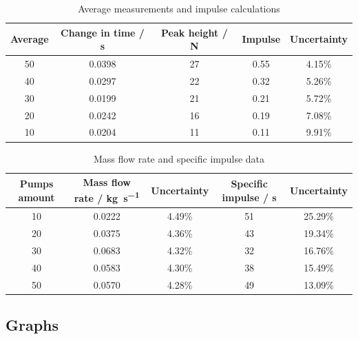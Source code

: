\documentclass[12pt,a4paper]{article}
\begin{document}
\begin{table}[H]
\centering
\caption{Average measurements and impulse calculations}
\begin{tabular}{@{}ccccc@{}}
\toprule
\textbf{Average} & \textbf{Change in time / \si{\second}} & \textbf{Peak height / \si{\newton}} & \textbf{Impulse} & \textbf{Uncertainty} \\
\midrule
50 & 0.0398 & 27 & 0.55 & 4.15\% \\
40 & 0.0297 & 22 & 0.32 & 5.26\% \\
30 & 0.0199 & 21 & 0.21 & 5.72\% \\
20 & 0.0242 & 16 & 0.19 & 7.08\% \\
10 & 0.0204 & 11 & 0.11 & 9.91\% \\
\bottomrule
\end{tabular}
\end{table}

\begin{table}[H]
\centering
\caption{Mass flow rate and specific impulse data}
\begin{tabular}{@{}ccccc@{}}
\toprule
\textbf{Pumps amount} & \textbf{Mass flow rate / \si{\kilo\gram\per\second}} & \textbf{Uncertainty} & \textbf{Specific impulse / \si{\second}} & \textbf{Uncertainty} \\
\midrule
10 & 0.0222 & 4.49\% & 51 & 25.29\% \\
20 & 0.0375 & 4.36\% & 43 & 19.34\% \\
30 & 0.0683 & 4.32\% & 32 & 16.76\% \\
40 & 0.0583 & 4.30\% & 38 & 15.49\% \\
50 & 0.0570 & 4.28\% & 49 & 13.09\% \\
\bottomrule
\end{tabular}
\end{table}

\subsection{Graphs}
\end{document}
